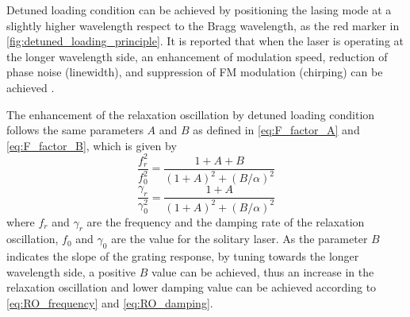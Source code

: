 Detuned loading condition can be achieved by positioning the lasing mode at a slightly higher wavelength respect to the Bragg wavelength, as the red marker in \autoref{fig:detuned_loading_principle}. It is reported that when the laser is operating at the longer wavelength side, an enhancement of modulation speed, reduction of phase noise (linewidth), and suppression of FM modulation (chirping) can be achieved \cite{vahala1984detuned}. 

The enhancement of the relaxation oscillation by detuned loading condition follows the same parameters $A$ and $B$ as defined in \autoref{eq:F_factor_A} and \autoref{eq:F_factor_B}, which is given by \cite{agrawal1988modulation}
\begin{equation}
    \frac{f_r^2}{f_{0}^2}=\frac{1+A+B}{(1+A)^2+(B/\alpha)^2}
    \label{eq:RO_frequency}
\end{equation}
\begin{equation}
    \frac{\gamma_r}{\gamma_{0}^2}=\frac{1+A}{(1+A)^2+(B/\alpha)^2}
    \label{eq:RO_damping}
\end{equation}
where $f_r$ and $\gamma_r$ are the frequency and the damping rate of the relaxation oscillation, $f_{0}$ and $\gamma_0$ are the value for the solitary laser. As the parameter $B$ indicates the slope of the grating response, by tuning towards the longer wavelength side, a positive $B$ value can be achieved, thus an increase in the relaxation oscillation and lower damping value can be achieved according to \autoref{eq:RO_frequency} and \autoref{eq:RO_damping}.






